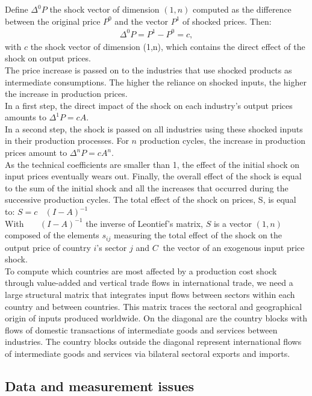 \documentclass[11pt,a4paper]{article}
\begin{document}
Define ${{\Delta }^{0}}P$ the shock vector of dimension $(1, n)$ computed as the difference between the original price $P^0$ and the vector $P^1$ of shocked prices. Then:
\begin{eqnarray*}
\Delta ^{0}P=P^1-P^0=c, 
\end{eqnarray*}
with $c$ the shock vector of dimension (1,n), which contains the direct effect of the shock on output prices.\\
The price increase is passed on to the industries that use shocked products as intermediate consumptions. The higher the reliance on shocked inputs, the higher the increase in production prices.\\
In a first step, the direct impact of the shock on each industry's output prices amounts to $\Delta^{1}P=cA$.\\
In a second step, the shock is passed on all industries using these shocked inputs in their production processes. For $n$ production cycles, the increase in production prices amount to $\Delta^n P=cA^n$.\\
As the technical coefficients are smaller than 1, the effect of the initial shock on input prices eventually wears out. Finally, the overall effect of the shock is equal to the sum of the initial shock and all the increases that occurred during the successive production cycles. The total effect of the shock on prices, S, is equal to: 
	$S=c \!\!~\!\!\text{ }{{\left( I-A \right)}^{-1}}$\\
With $\text{ }\!\!~\!\!\text{ }{{\left( I-A \right)}^{-1}}$ the inverse of Leontief's matrix, $S$ is a vector $(1, n)$ composed of the elements $s_{ij}$ measuring the total effect of the shock on the output price of country $i$'s sector $j$ and $C~$ the vector of an exogenous input price shock.\\
To compute which countries are most affected by a production cost shock through value-added and vertical trade flows in international trade, we need a large structural matrix that integrates input flows between sectors within each country and between countries. This matrix traces the sectoral and geographical origin of inputs produced worldwide. On the diagonal are the country blocks with flows of domestic transactions of intermediate goods and services between industries. The country blocks outside the diagonal represent international flows of intermediate goods and services via bilateral sectoral exports and imports. 


\subsection{Data and measurement issues}
\label{subsec:data}
\end{document}
